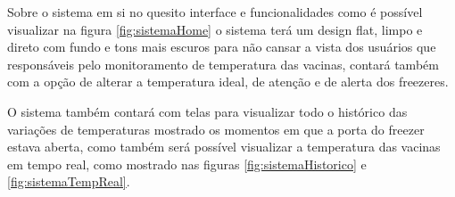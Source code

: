 \documentclass[hidelinks, 12pt, a4paper, brazil, oneside]{abntex2}
\begin{document}
    Sobre o sistema em si no quesito interface e funcionalidades
    como é possível visualizar na figura \ref{fig:sistemaHome}
    o sistema terá um design flat, limpo e direto com fundo e 
    tons mais escuros para não cansar a vista dos usuários que 
    responsáveis pelo monitoramento de temperatura das vacinas,
    contará também com a opção de alterar a temperatura ideal,
    de atenção e de alerta dos freezeres.


    O sistema também contará com telas para visualizar todo
    o histórico das variações de temperaturas mostrado os 
    momentos em que a porta do freezer estava aberta, 
    como também será possível visualizar a temperatura 
    das vacinas em tempo real, como mostrado nas figuras
    \ref{fig:sistemaHistorico} e \ref{fig:sistemaTempReal}.
\end{document}

